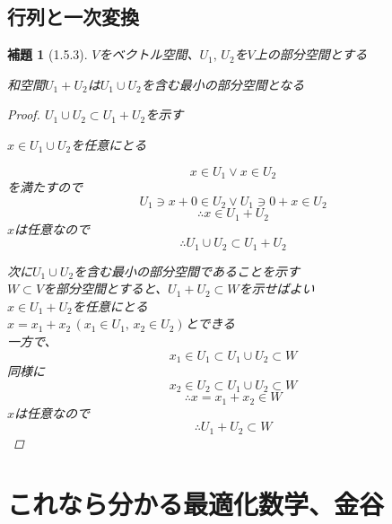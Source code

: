 \documentclass{book}
\newtheorem*{lemma}{補題}
\begin{document}
\section{行列と一次変換}

\begin{lemma}[1.5.3]
  $V$をベクトル空間、$U_1,\,U_2$を$V$上の部分空間とする

  和空間$U_1+U_2$は$U_1\cup U_2$を含む最小の部分空間となる

  \begin{proof}
    $U_1\cup U_2 \subset U_1+U_2$を示す

    $x\in U_1\cup U_2$を任意にとる

    \[
      x\in U_1\lor x\in U_2
    \]
    を満たすので
    \[
      U_1\ni x + 0 \in U_2\lor U_1\ni 0 + x\in U_2
    \]
    \[
      \therefore x\in U_1 + U_2
    \]
    $x$は任意なので
    \[
      \therefore U_1\cup U_2 \subset U_1+U_2
    \]

    次に$U_1\cup U_2$を含む最小の部分空間であることを示す\\
    $W \subset V$を部分空間とすると、$U_1+U_2\subset W$を示せばよい\\
    $x\in U_1+U_2$を任意にとる\\
    $x=x_1+x_2\,(x_1\in U_1,\,x_2\in U_2)$とできる\\
    一方で、
    \[
      x_1\in U_1 \subset U_1\cup U_2\subset W
    \]
    同様に
    \[
      x_2\in U_2 \subset U_1\cup U_2\subset W
    \]
    \[
      \therefore x = x_1+x_2\in W
    \]
    $x$は任意なので
    \[
      \therefore U_1+U_2\subset W
    \]
  \end{proof}
\end{lemma}

\chapter{これなら分かる最適化数学、金谷}
\end{document}
